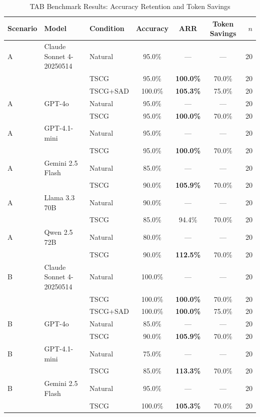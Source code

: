 \begin{table}[htbp]
  \centering
  \caption{TAB Benchmark Results: Accuracy Retention and Token Savings}
  \label{tab:main-results}
  \small
  \begin{tabular}{lllcccr}
    \toprule
    Scenario & Model & Condition & Accuracy & ARR & Token Savings & $n$ \\
    \midrule
    A & Claude Sonnet 4-20250514 & Natural & 95.0\% & --- & --- & 20 \\
    & & TSCG & 95.0\% & \textbf{100.0\%} & 70.0\% & 20 \\
    & & TSCG+SAD & 100.0\% & \textbf{105.3\%} & 75.0\% & 20 \\
    A & GPT-4o & Natural & 95.0\% & --- & --- & 20 \\
    & & TSCG & 95.0\% & \textbf{100.0\%} & 70.0\% & 20 \\
    A & GPT-4.1-mini & Natural & 95.0\% & --- & --- & 20 \\
    & & TSCG & 95.0\% & \textbf{100.0\%} & 70.0\% & 20 \\
    A & Gemini 2.5 Flash & Natural & 85.0\% & --- & --- & 20 \\
    & & TSCG & 90.0\% & \textbf{105.9\%} & 70.0\% & 20 \\
    A & Llama 3.3 70B & Natural & 90.0\% & --- & --- & 20 \\
    & & TSCG & 85.0\% & 94.4\% & 70.0\% & 20 \\
    A & Qwen 2.5 72B & Natural & 80.0\% & --- & --- & 20 \\
    & & TSCG & 90.0\% & \textbf{112.5\%} & 70.0\% & 20 \\
    \addlinespace
    B & Claude Sonnet 4-20250514 & Natural & 100.0\% & --- & --- & 20 \\
    & & TSCG & 100.0\% & \textbf{100.0\%} & 70.0\% & 20 \\
    & & TSCG+SAD & 100.0\% & \textbf{100.0\%} & 75.0\% & 20 \\
    B & GPT-4o & Natural & 85.0\% & --- & --- & 20 \\
    & & TSCG & 90.0\% & \textbf{105.9\%} & 70.0\% & 20 \\
    B & GPT-4.1-mini & Natural & 75.0\% & --- & --- & 20 \\
    & & TSCG & 85.0\% & \textbf{113.3\%} & 70.0\% & 20 \\
    B & Gemini 2.5 Flash & Natural & 95.0\% & --- & --- & 20 \\
    & & TSCG & 100.0\% & \textbf{105.3\%} & 70.0\% & 20 \\

\end{tabular}
\end{table}
